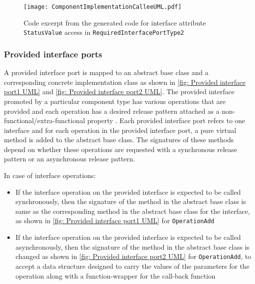 \begin{figure}[h]
	\centering
	\texttt{[image: ComponentImplementationCalleeUML.pdf]}
	\caption{Code excerpt from the generated code for interface attribute \texttt{StatusValue} access in \texttt{Required\allowbreak InterfacePort\allowbreak Type2}}
	\label{fig: Component implementation Callee UML}
\end{figure}

\subsubsection{\textbf{Provided interface ports}}
A provided interface port is mapped to an abstract base class and a corresponding concrete implementation class as shown in \cref{fig: Provided interface port1 UML} and \cref{fig: Provided interface port2 UML}. The provided interface promoted by a particular component type has various operations that are provided and each operation has a desired release pattern attached as a non-functional/extra-functional property \cite{SpecMetamodel,CompBasedProcess}. Each provided interface port refers to one interface and for each operation in the provided interface port, a pure virtual method is added to the abstract base class. The signatures of these methods depend on whether these operations are requested with a synchronous release pattern or an asynchronous release pattern.

In case of interface operations:
\begin{itemize}
\item If the interface operation on the provided interface is expected to be called synchronously, then the signature of the method in the abstract base class is same as the corresponding method in the abstract base class for the interface, as shown in \cref{fig: Provided interface port1 UML} for \texttt{OperationAdd}
\item If the interface operation on the provided interface is expected to be called asynchronously, then the signature of the method in the abstract base class is changed as shown in \cref{fig: Provided interface port2 UML} for \texttt{OperationAdd}, to accept a data structure designed to carry the values of the parameters for the operation along with a function-wrapper for the call-back function     
\end{itemize}   

